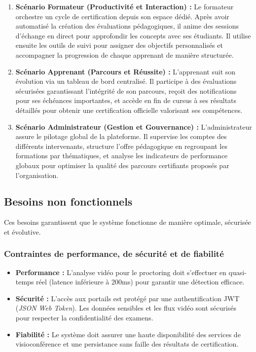 \begin{enumerate}
    \item \textbf{Scénario Formateur (Productivité et Interaction) :} Le formateur orchestre un cycle de certification depuis son espace dédié. Après avoir automatisé la création des évaluations pédagogiques, il anime des sessions d'échange en direct pour approfondir les concepts avec ses étudiants. Il utilise ensuite les outils de suivi pour assigner des objectifs personnalisés et accompagner la progression de chaque apprenant de manière structurée.
    
    \item \textbf{Scénario Apprenant (Parcours et Réussite) :} L'apprenant suit son évolution via un tableau de bord centralisé. Il participe à des évaluations sécurisées garantissant l'intégrité de son parcours, reçoit des notifications pour ses échéances importantes, et accède en fin de cursus à ses résultats détaillés pour obtenir une certification officielle valorisant ses compétences.
    
    \item \textbf{Scénario Administrateur (Gestion et Gouvernance) :} L'administrateur assure le pilotage global de la plateforme. Il supervise les comptes des différents intervenants, structure l'offre pédagogique en regroupant les formations par thématiques, et analyse les indicateurs de performance globaux pour optimiser la qualité des parcours certifiants proposés par l'organisation.
\end{enumerate}

\subsection{Besoins non fonctionnels}
Ces besoins garantissent que le système fonctionne de manière optimale, sécurisée et évolutive.

\subsubsection{Contraintes de performance, de sécurité et de fiabilité}
\begin{itemize}
    \item \textbf{Performance :} L'analyse vidéo pour le proctoring doit s'effectuer en quasi-temps réel (latence inférieure à 200ms) pour garantir une détection efficace.
    \item \textbf{Sécurité :} L'accès aux portails est protégé par une authentification JWT (\textit{JSON Web Token}). Les données sensibles et les flux vidéo sont sécurisés pour respecter la confidentialité des examens.
    \item \textbf{Fiabilité :} Le système doit assurer une haute disponibilité des services de visioconférence et une persistance sans faille des résultats de certification.
\end{itemize}


